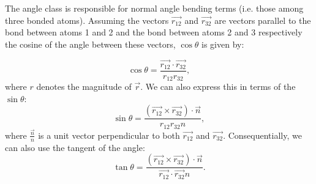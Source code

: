 The angle class is responsible for normal angle bending terms (i.\+e. those among three bonded atoms). Assuming the vectors $\vec{r_{12}}$ and $\vec{r_{32}}$ are vectors parallel to the bond between atoms 1 and 2 and the bond between atoms 2 and 3 respectively the cosine of the angle between these vectors, $\cos\theta$ is given by\+:

\[ \cos\theta=\frac{\vec{r_{12}}\cdot\vec{r_{32}}} {r_{12} r_{32}}, \] where $r$ denotes the magnitude of $\vec{r}$. We can also express this in terms of the $\sin\theta$\+: \[ \sin\theta=\frac{\left(\vec{r_{12}}\times\vec{r_{32}}\right)\cdot\vec{n}} {r_{12} r_{32} n}, \] where $\frac{\vec{n}}{n}$ is a unit vector perpendicular to both $\vec{r_{12}}$ and $\vec{r_{32}}$. Consequentially, we can also use the tangent of the angle\+: \[ \tan\theta=\frac{\left(\vec{r_{12}}\times\vec{r_{32}}\right)\cdot\vec{n}} {\vec{r_{12}}\cdot\vec{r_{32}}n}. \] 